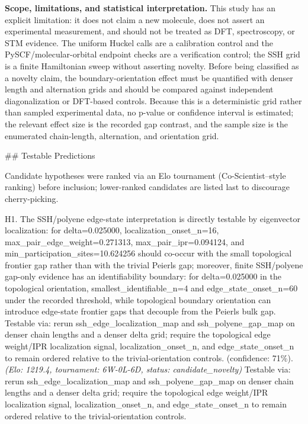 \documentclass[11pt,a4paper]{article}
\begin{document}
\textbf{Scope, limitations, and statistical interpretation.} This study has an explicit limitation: it does not claim a new molecule, does not assert an experimental measurement, and should not be treated as DFT, spectroscopy, or STM evidence. The uniform Huckel calls are a calibration control and the PySCF/molecular-orbital endpoint checks are a verification control; the SSH grid is a finite Hamiltonian sweep without asserting novelty. Before being classified as a novelty claim, the boundary-orientation effect must be quantified with denser length and alternation grids and should be compared against independent diagonalization or DFT-based controls. Because this is a deterministic grid rather than sampled experimental data, no p-value or confidence interval is estimated; the relevant effect size is the recorded gap contrast, and the sample size is the enumerated chain-length, alternation, and orientation grid.

\#\# Testable Predictions

Candidate hypotheses were ranked via an Elo tournament (Co-Scientist–style ranking) before inclusion; lower-ranked candidates are listed last to discourage cherry-picking.

H1. The SSH/polyene edge-state interpretation is directly testable by eigenvector localization: for delta=0.025000, localization\_onset\_n=16, max\_pair\_edge\_weight=0.271313, max\_pair\_ipr=0.094124, and min\_participation\_sites=10.624256 should co-occur with the small topological frontier gap rather than with the trivial Peierls gap; moreover, finite SSH/polyene gap-only evidence has an identifiability boundary: for delta=0.025000 in the topological orientation, smallest\_identifiable\_n=4 and edge\_state\_onset\_n=60 under the recorded threshold, while topological boundary orientation can introduce edge-state frontier gaps that decouple from the Peierls bulk gap. Testable via: rerun ssh\_edge\_localization\_map and ssh\_polyene\_gap\_map on denser chain lengths and a denser delta grid; require the topological edge weight/IPR localization signal, localization\_onset\_n, and edge\_state\_onset\_n to remain ordered relative to the trivial-orientation controls. (confidence: 71\%). \textit{(Elo: 1219.4, tournament: 6W-0L-6D, status: candidate\_novelty)} Testable via: rerun ssh\_edge\_localization\_map and ssh\_polyene\_gap\_map on denser chain lengths and a denser delta grid; require the topological edge weight/IPR localization signal, localization\_onset\_n, and edge\_state\_onset\_n to remain ordered relative to the trivial-orientation controls.
\end{document}
